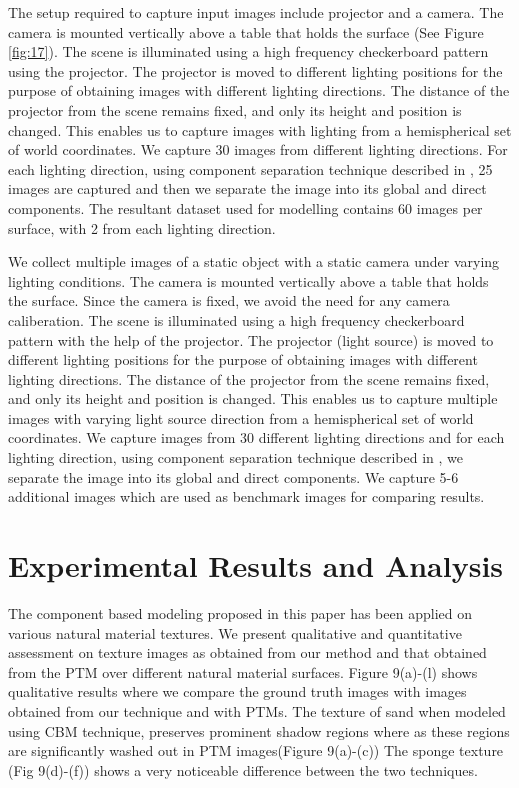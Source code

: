 The setup required to capture input images include projector and a camera. The
camera is mounted vertically above a table that holds the surface (See Figure \ref{fig:17}). The scene is
illuminated using a high frequency checkerboard pattern using the projector. The
projector is moved to different lighting positions for the purpose of obtaining
images with different lighting directions. The distance of the projector from
the scene remains fixed, and only its height and position is changed. This
enables us to capture images with lighting from a hemispherical set of world
coordinates. We capture 30 images from different lighting directions. For each
lighting direction, using component separation technique described in \cite{B4},
25 images are captured and then we separate the image into its global and direct components. The resultant
dataset used for modelling contains 60 images per surface, with 2 from each lighting direction.

We collect multiple images of a static object with a static camera under varying
lighting conditions. The
camera is mounted vertically above a table that holds the surface. Since the camera is fixed, we avoid the
need for any camera caliberation. 
The scene is illuminated using a high frequency checkerboard pattern with the help of the projector. The
projector (light source) is moved to different lighting positions for the purpose of obtaining
images with different lighting directions. 
The distance of the projector from
the scene remains fixed, and only its height and position is changed. This
enables us to capture multiple images with varying light source direction from a hemispherical set of world
coordinates. We capture images from 30 different lighting directions and for each
lighting direction, using component separation technique described in \cite{A9},
we separate the image into its global and direct components. We capture 5-6 additional images which are used as 
benchmark images for comparing results.  


\section{Experimental Results and Analysis}

The component based modeling proposed in this paper has been applied on various
natural material textures. We present qualitative and quantitative assessment on
texture images as obtained from our method and that obtained from the PTM over
different natural material surfaces. Figure 9(a)-(l) shows qualitative results where we compare the
ground truth images with images obtained from our technique and with PTMs. The
texture of sand when modeled using CBM technique, preserves prominent shadow
regions where as these regions are significantly washed out in PTM images(Figure
9(a)-(c)) The sponge texture (Fig 9(d)-(f)) shows a very noticeable difference
between the two techniques.

